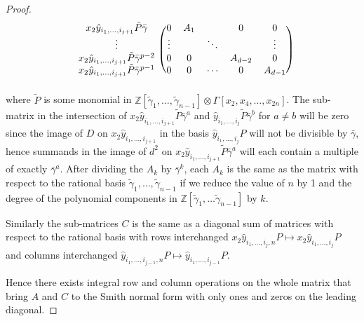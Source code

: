 \documentclass{article}
\theoremstyle{plain}
\theoremstyle{definition}
\numberwithin{thm}{section}
\begin{document}
\begin{proof}
\[\begin{blockarray}{cccccc}
\begin{block}{c(ccccc)}
						x_2\hat{y}_{i_1,\dots,i_{j+1}}\tilde{P}\bar{\gamma} 			& {0}	   & {A}_1 & 				& {0}				& {0}	 \\
						\vdots																			 		 			 		& \vdots & 			 & \ddots & 					& \vdots			\\
						x_2\hat{y}_{i_1,\dots,i_{j+1}}\tilde{P}\bar{\gamma}^{p-2} & {0}	   & 	{0}  & 				& {A}_{d-2} & {0}		 \\
						x_2\hat{y}_{i_1,\dots,i_{j+1}}\tilde{P}\bar{\gamma}^{p-1} & {0}	   & 	{0}  & \cdots & {0}				& {A}_{d-1} \\
					\end{block}
				\end{blockarray}
				\]
				where $\tilde{P}$ is some monomial in $\mathbb{Z}[\tilde{\gamma}_1,\dots,\tilde{\gamma}_{n-1}]\otimes\Gamma[x_2,x_4,\dots,x_{2n}]$.
				The sub-matrix in the intersection of 
				$x_2\hat{y}_{i_1,\dots,i_{j+1}}\tilde{P}\bar{\gamma}^{a}$
				and
				$\hat{y}_{i_1,\dots,i_{j}}\tilde{P}\bar{\gamma}^{b}$
				for $a\neq b$
				will be zero since the image of $D$ on $x_2\hat{y}_{i_1,\dots,i_{j+1}}$ in the basis $\hat{y}_{i_1,\dots,i_j}P$
				will not be divisible by $\bar\gamma$,
				hence summands in the image of $d^2$ on $x_2\hat{y}_{i_1,\dots,i_{j+1}}\tilde{P}\bar{\gamma}^{a}$ will each contain a multiple of exactly $\bar{\gamma}^a$.
				After dividing the $A_k$ by $\bar{\gamma}^k$, each $A_k$
				is the same as the matrix with respect to the rational basis $\tilde{\gamma}_1,\dots,\tilde{\gamma}_{n-1}$
				if we reduce the value of $n$ by 1 and the degree of the polynomial components in $\mathbb{Z}[\tilde{\gamma}_1,\dots\tilde{\gamma}_{n-1}]$ by $k$.
				
				Similarly the sub-matrices $C$ is the same as a diagonal sum of matrices with respect to the rational basis with rows interchanged
				$x_2\hat{y}_{i_1,\dots,i_j,n}P\mapsto x_2\hat{y}_{i_1,\dots,i_j}P$
				and columns interchanged $\hat{y}_{i_1,\dots,i_{j-1},n}P\mapsto \hat{y}_{i_1,\dots,i_{j-1}}P$.
				
				Hence there exists integral row and column operations on the whole matrix that bring $A$ and $C$ to the Smith normal form
				with only ones and zeros on the leading diagonal.
				

\end{proof}
\end{document}
